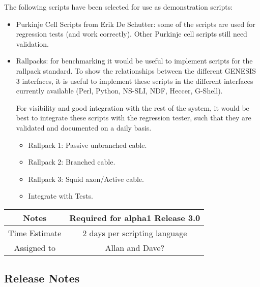 \documentclass[12pt]{article}
\begin{document}
The following scripts have been selected for use as demonstration
scripts:

\begin{itemize}
\item Purkinje Cell Scripts from Erik De Schutter: some of the scripts
  are used for regression tests (and work correctly).  Other Purkinje
  cell scripts still need validation.
\item Rallpacks: for benchmarking it would be useful to implement
  scripts for the rallpack standard.  To show the relationships
  between the different GENESIS\,3 interfaces, it is useful to
  implement these scripts in the different interfaces currently
  available (Perl, Python, NS-SLI, NDF, Heccer, G-Shell).

  For visibility and good integration with the rest of the system, it
  would be best to integrate these scripts with the regression tester,
  such that they are validated and documented on a daily basis.
  \begin{itemize}
  \item Rallpack 1: Passive unbranched cable.
  \item Rallpack 2: Branched cable.
  \item Rallpack 3: Squid axon/Active cable.
  \item Integrate with Tests.
  \end{itemize}
\end{itemize}

{
  \vspace{5mm}
  \centering
  \begin{tabular}{|c|c|}
    \hline
    Notes
    & Required for alpha1 Release 3.0 \\
    \hline
    Time Estimate
    & 2 days per scripting language \\
    \hline
    Assigned to
    & Allan and Dave? \\
    \hline
  \end{tabular}
}


\subsection{Release Notes}
\end{document}

